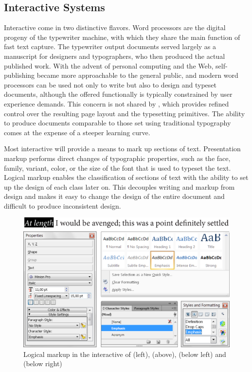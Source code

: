 \documentclass[
  a5paper,10pt,           %
  dvipsnames              %
]{book}
\begin{document}
\subsection{Interactive Systems}
Interactive  come in two distinctive flavors. Word processors
 are the digital progeny of the
typewriter machine, with which they share the main function of fast text
capture. The typewriter output documents served largely as a manuscript for
designers and typographers, who then produced the actual published work. With
the advent of personal computing and the Web, self-publishing became more
approachable to the general public, and modern word processors can be used not
only to write but also to design and typeset documents, although the offered
functionally is typically constrained by user experience demands. This concern
is not shared by , which provides
refined control over the resulting page layout and the typesetting primitives.
The ability to produce documents comparable to those set using traditional
typography comes at the expense of a steeper learning curve.

Most interactive  will provide a means to mark up sections of text.
Presentation markup performs direct changes of typographic properties, such as
the face, family, variant, color, or the size of the font that is used to
typeset the text. Logical markup enables the classification of sections of text
with the ability to set up the design of each class later on. This decouples
writing and markup from design and makes it easy to change the design of the
entire document and difficult to produce inconsistent design.

\begin{figure}
  \includegraphics[width=\textwidth]{examples/02/interactive-editors.png}
  \caption{Logical markup in the interactive  of 
    (left),  (above),  (below left) and
     (below right)}
\end{figure}
\end{document}

